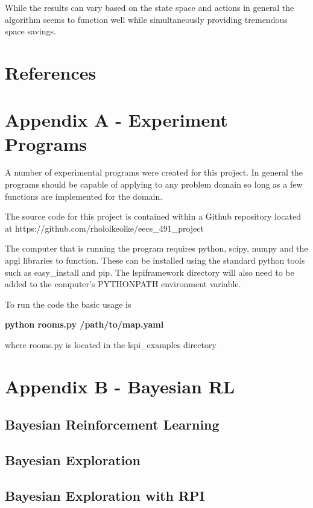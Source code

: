 \documentclass[12pt, letterpaper, final]{report}
\begin{document}
While the results can vary based on the state space and actions in
general the algorithm seems to function well while simultaneously
providing tremendous space savings.

\section{References}

\section{Appendix A - Experiment Programs}

A number of experimental programs were created for this project. In
general the programs should be capable of applying to any problem
domain so long as a few functions are implemented for the domain. 

The source code for this project is contained within a Github
repository located at https://github.com/rhololkeolke/eecs\_491\_project

The computer that is running the program requires python, scipy, numpy
and the apgl libraries to function. These can be installed using the
standard python tools such as easy\_install and pip.  The lspiframework directory will also need to be added to the
computer's PYTHONPATH environment variable.

To run the code the basic usage is 

\vspace{5 mm}
{\bf python rooms.py /path/to/map.yaml}
\vspace{5 mm}

where rooms.py is located in the lspi\_examples directory

\section{Appendix B - Bayesian RL}

\subsection*{Bayesian Reinforcement Learning}


\subsection*{Bayesian Exploration}

\subsection*{Bayesian Exploration with RPI}
\end{document}
